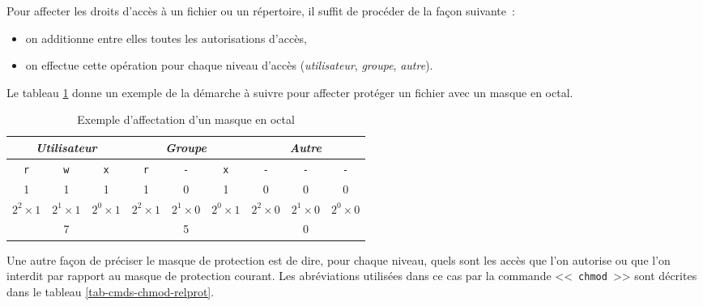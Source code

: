 Pour affecter les droits d'acc{\`e}s {\`a} un fichier ou un r{\'e}pertoire, il suffit
de proc{\'e}der de la fa\c{c}on suivante~:
\begin{itemize}
	\item on additionne entre elles toutes les autorisations d'acc{\`e}s,
	\item on effectue cette op{\'e}ration pour chaque niveau d'acc{\`e}s
		  ({\sl utilisateur}, {\sl groupe}, {\sl autre}).
\end{itemize}

\begin{example}
Le tableau \ref{tab-cmds-exchmod-oct} donne un exemple de la d{\'e}marche
{\`a} suivre pour affecter prot{\'e}ger un fichier avec un masque en octal.

\begin{table}[hbtp]
\centering
\begin{tabular}{|ccc|ccc|ccc|}
	\hline
		\multicolumn{3}{|c|}{{\sl Utilisateur}}	&
		\multicolumn{3}{|c|}{{\sl Groupe}}		&
		\multicolumn{3}{|c|}{{\sl Autre}}	\\
	\hline
		{\tt r} & {\tt w} & {\tt x}	&
		{\tt r} & {\tt -} & {\tt x}	&
		{\tt -} & {\tt -} & {\tt -}	\\
	\hline
		1              & 1              & 1              &
		1              & 0              & 1              &
		0              & 0              & 0              \\
		$2^2 \times 1$ & $2^1 \times 1$ & $2^0 \times 1$ &
		$2^2 \times 1$ & $2^1 \times 0$ & $2^0 \times 1$ &
		$2^2 \times 0$ & $2^1 \times 0$ & $2^0 \times 0$ \\
		\multicolumn{3}{|c|}{7}	&
		\multicolumn{3}{|c|}{5}		&
		\multicolumn{3}{|c|}{0}	\\
	\hline
\end{tabular}
\caption{\label{tab-cmds-exchmod-oct}Exemple d'affectation d'un masque en octal}
\end{table}
\end{example}

Une autre fa\c{c}on de pr{\'e}ciser le masque de protection est de dire, pour
chaque niveau, quels sont les acc{\`e}s que l'on autorise ou que l'on
interdit par rapport au masque de protection courant. Les abr{\'e}viations
utilis{\'e}es dans ce cas par la commande <<~{\tt chmod}~>> sont d{\'e}crites dans le
tableau \ref{tab-cmds-chmod-relprot}.

